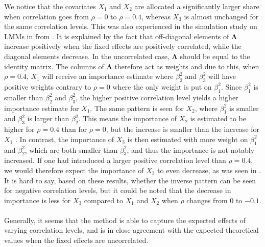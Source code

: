 We notice that the covariates $X_1$ and $X_2$ are allocated a significantly larger share when correlation goes from $\rho=0$ to $\rho=0.4$, whereas $X_3$ is almost unchanged for the same correlation levels. This was also experienced in the simulation study on LMMs in  from \citet{Arnstad:Relative_variable_importance_in_Bayesian_linear_mixed_models:2024}. It is explained by the fact that off-diagonal elements of $\boldsymbol{\Lambda}$ increase positively when the fixed effects are positively correlated, while the diagonal elements decrease. In the uncorrelated case, $\boldsymbol{\Lambda}$ should be equal to the identity matrix. The columns of $\boldsymbol{\Lambda}$ therefore act as weights and due to this, when $\rho=0.4$, $X_1$ will receive an importance estimate where $\beta_2^2$ and $\beta_3^2$ will have positive weights contrary to $\rho=0$ where the only weight is put on $\beta_1^2$. Since $\beta_1^2$ is smaller than $\beta_2^2$ and $\beta_3^2$, the higher positive correlation level yields a higher importance estimate for $X_1$. The same pattern is seen for $X_2$, where $\beta_1^2$ is smaller and $\beta_3^2$ is larger than $\beta_2^2$. This means the importance of $X_2$ is estimated to be higher for $\rho=0.4$ than for $\rho=0$, but the increase is smaller than the increase for $X_1$ \citep{Arnstad:Relative_variable_importance_in_Bayesian_linear_mixed_models:2024}. In contrast, the importance of $X_3$ is then estimated with more weight on $\beta_1^2$ and $\beta_2^2$, which are both smaller than $\beta_3^2$, and thus the importance is not notably increased. If one had introduced a larger positive correlation level than $\rho=0.4$, we would therefore expect the importance of $X_3$ to even decrease, as was seen in \citet{Arnstad:Relative_variable_importance_in_Bayesian_linear_mixed_models:2024}. It is hard to say, based on these results, whether the inverse pattern can be seen for negative correlation levels, but it could be noted that the decrease in importance is less for $X_3$ compared to $X_1$ and $X_2$ when $\rho$ changes from $0$ to $-0.1$.
\\
\\
Generally, it seems that the method is able to capture the expected effects of varying correlation levels, and is in close agreement with the expected theoretical values when the fixed effects are uncorrelated. 
